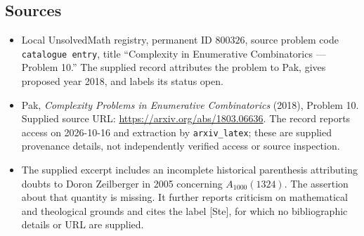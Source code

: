 \documentclass[11pt]{article}
\begin{document}
\subsection{Sources}
\begin{itemize}
\item Local UnsolvedMath registry, permanent ID \(800326\), source problem code \texttt{catalogue entry}, title ``Complexity in Enumerative Combinatorics --- Problem 10.'' The supplied record attributes the problem to Pak, gives proposed year 2018, and labels its status open.
\item Pak, \emph{Complexity Problems in Enumerative Combinatorics} (2018), Problem 10. Supplied source URL: \url{https://arxiv.org/abs/1803.06636}. The record reports access on 2026-10-16 and extraction by \texttt{arxiv\_latex}; these are supplied provenance details, not independently verified access or source inspection.
\item The supplied excerpt includes an incomplete historical parenthesis attributing doubts to Doron Zeilberger in 2005 concerning \(A_{1000}(1324)\). The assertion about that quantity is missing. It further reports criticism on mathematical and theological grounds and cites the label [Ste], for which no bibliographic details or URL are supplied.
\end{itemize}
\end{document}
